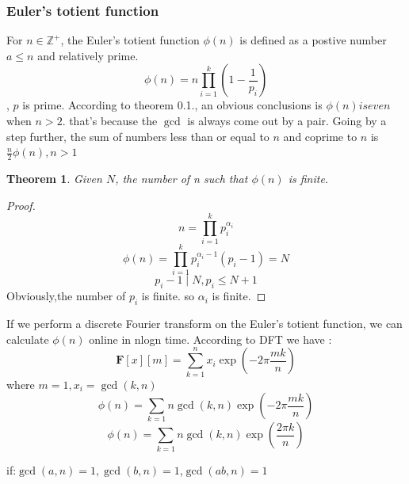 \documentclass[10pt,a4paper]{article}
\newtheorem{theorem}{Theorem}[section]
\begin{document}
\subsubsection{Euler's totient function}
For $n\in\mathbb{Z^{+}}$, the Euler's totient function $\phi(n)$ is defined as a postive number
$a\le n$ and relatively prime.
\[\phi(n)=n\prod\limits_{i=1}^{k}(1-\frac{1}{p_i})\], $p$ is prime.
According to theorem 0.1., an obvious conclusions is $\phi(n) is even$ when $n>2$.
that's because the $\gcd$ is always come out by a pair. Going by a step further, 
the sum of numbers less than or equal to $n$ and coprime to $n$ is $\frac{n}{2}\phi(n),n>1$
\begin{theorem}
    Given $N$, the number of n such that $\phi(n)$ is finite.
\end{theorem}
\begin{proof}
    \[n=\prod\limits_{i=1}^{k}p_i^{\alpha_i}\]
    \[\phi(n)=\prod\limits_{i=1}^{k}p_i^{\alpha_i-1}(p_i-1)=N\]
    \[p_i-1\mid N,p_i\le N+1\]
    Obviously,the number of $p_i$ is finite. so $\alpha_i$ is finite.
\end{proof}
If we perform a discrete Fourier transform on the Euler's totient function, we can calculate $\phi(n)$ online in nlogn time.
According to DFT we have :
\[\mathbf{F}[x][m]=\sum\limits_{k=1}^{n}x_i\exp(-2\pi\frac{mk}{n})\]where $m=1,x_i=\gcd(k,n)$
\[\phi(n)=\sum\limits_{k=1}{n}\gcd(k,n)\exp(-2\pi\frac{mk}{n})\]
\[\phi(n)=\sum\limits_{k=1}{n}\gcd(k,n)\exp(\frac{2\pi k}{n})\]

if:$\gcd(a,n)=1,\gcd(b,n)=1$,$\gcd(ab,n)=1$
\end{document}
